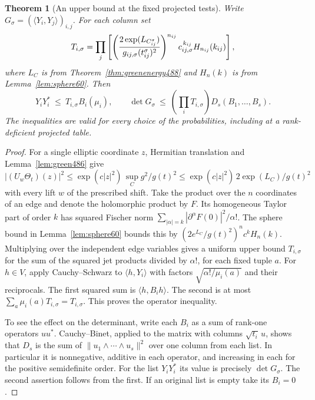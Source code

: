 \documentclass[a4paper,11pt]{article}
\newtheorem{theorem}[proposition]{Theorem}
\theoremstyle{definition}
\theoremstyle{remark}
\numberwithin{equation}{section}
\begin{document}
\begin{theorem}[An upper bound at the fixed projected tests]\leavevmode
\label{thm:projectedmatrices489}
Write \(G_\sigma=(\langle Y_i,Y_j\rangle)_{i,j}\). For each column set
\[
 T_{i,\sigma}=\prod_j
 \left[
   \left({2\exp(L_{C_{ij}^\sigma})\over
                   g_{ij,\sigma}(t_{ij}^\sigma)^2}\right)^{n_{ij}}
       c_{ij,\sigma}^{\,k_{ij}}H_{n_{ij}}(k_{ij})\right],
\]
where \(L_C\) is from Theorem~\ref{thm:greenenergy488} and \(H_n(k)\)
is from Lemma~\ref{lem:sphere60}. Then
\[
    Y_iY_i^*\ \le\ T_{i,\sigma}B_i(\mu_i),\qquad
    \det G_\sigma\ \le\
        \left(\prod_i T_{i,\sigma}\right)D_s(B_1,\ldots,B_s).
\]
The inequalities are valid for every choice of the probabilities,
including at a rank-deficient projected table.
\end{theorem}
\begin{proof}
For a single elliptic coordinate \(z\), Hermitian translation and
Lemma~\ref{lem:green486} give
\[
 |(U_w\Theta_t)(z)|^2
 \le \exp(c|z|^2)\,\sup_C g^2/g(t)^2
 \le \exp(c|z|^2)\,2\exp(L_C)/g(t)^2
\]
with every lift \(w\) of the prescribed shift. Take the product over
the \(n\) coordinates of an edge and denote the holomorphic product
by \(F\). Its homogeneous Taylor part of order \(k\) has squared
Fischer norm \(\sum_{|\alpha|=k}|\partial^\alpha F(0)|^2/\alpha!\).
The sphere bound in Lemma~\ref{lem:sphere60} bounds this by
\((2e^{L_C}/g(t)^2)^n c^k H_n(k)\). Multiplying over the independent
edge variables gives a uniform upper bound \(T_{i,\sigma}\) for the
sum of the squared jet products divided by \(\alpha!\), for each fixed
tuple \(a\). For \(h\in V\), apply Cauchy--Schwarz to
\(\langle h,Y_i\rangle\) with factors
\(\sqrt{\alpha!/\mu_i(a)}\) and their reciprocals.
The first squared sum is \(\langle h,B_i h\rangle\). The second is
at most \(\sum_a\mu_i(a)T_{i,\sigma}=T_{i,\sigma}\).
This proves the operator inequality.

To see the effect on the determinant, write each \(B_i\) as a sum
of rank-one operators \(u u^*\). Cauchy--Binet, applied to the
matrix with columns \(\sqrt{t_i}\,u\), shows that \(D_s\) is the
sum of \(\|u_1\wedge\cdots\wedge u_s\|^2\) over one column from
each list. In particular it is nonnegative, additive in each
operator, and increasing in each for the positive semidefinite order.
For the list \(Y_iY_i^*\) its value is precisely \(\det G_\sigma\).
The second assertion follows from the first. If an original list is
empty take its \(B_i=0\).
\end{proof}
\end{document}
